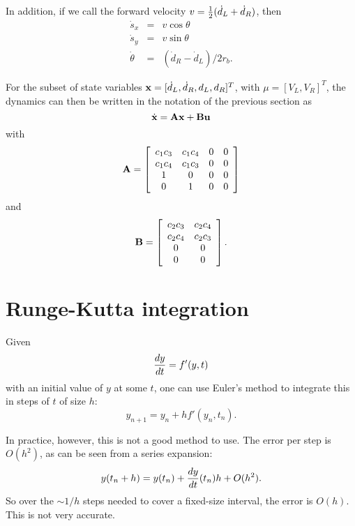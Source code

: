 \documentclass[12pt]{article}
\begin{document}
In addition, if we call the forward velocity
$v = {1\over 2}(\dot d_L + \dot d_R)$, then
\begin{eqnarray}
  \dot s_x &=& v \cos \theta \\
  \dot s_y &=& v \sin \theta \\
  \dot \theta &=& (\dot d_R - \dot d_L) / 2r_b.
\end{eqnarray}

For the subset of state variables
${\bf x} = [\dot d_L, \dot d_R, d_L, d_R]^T$, with $\mu = [V_L, V_R]^T$,
the dynamics can then be written in the notation of the previous
section as
\begin{equation}
  \dot{{\bf x}} = {\bf A}{\bf x} + {\bf B} {\bf u}
\end{equation}
with
\begin{equation}
  {\bf A} = \left[ \begin{array}{cccc}
  c_1c_3 & c_1c_4 & 0 & 0 \\
  c_1c_4 & c_1c_3 & 0 & 0 \\
  1 & 0 & 0 & 0 \\
  0 & 1 & 0 & 0 \\
\end{array} \right]
\end{equation}
and
\begin{equation}
  {\bf B} = \left[ \begin{array}{cc}
  c_2c_3 & c_2c_4 \\
  c_2c_4 & c_2c_3 \\
  0 & 0 \\
  0 & 0 \\
\end{array} \right].
\end{equation}


\section{Runge-Kutta integration}

Given
\begin{equation}
  {dy \over dt} = f'(y, t)
\end{equation}
with an initial value of $y$ at some $t$, one can use Euler's method
to integrate this in steps of $t$ of size $h$:
\begin{equation}
  y_{n+1} = y_n + hf'(y_n, t_n).
\end{equation}

In practice, however, this is not a good method to use.
The error per step is $O(h^2)$, as can be seen from a series expansion:
\begin{equation}
  y(t_n+h) = y(t_n) + {dy\over dt}(t_n) h + O(h^2).
\end{equation}
So over the $\sim 1/h$ steps needed to cover a fixed-size interval,
the error is $O(h)$.  This is not very accurate.
\end{document}
